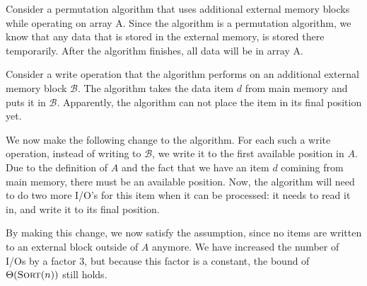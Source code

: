 Consider a permutation algorithm that uses additional external memory blocks while operating on array A.
Since the algorithm is a permutation algorithm, we know that any data that is stored in the external memory, is stored there temporarily.
After the algorithm finishes, all data will be in array A.

Consider a write operation that the algorithm performs on an additional external memory block $\mathcal{B}$.
The algorithm takes the data item $d$ from main memory and puts it in $\mathcal{B}$.
Apparently, the algorithm can not place the item in its final position yet.

We now make the following change to the algorithm.
For each such a write operation, instead of writing to $\mathcal{B}$, we write it to the first available position in $A$.
Due to the definition of $A$ and the fact that we have an item $d$ comining from main memory, there must be an available position.
Now, the algorithm will need to do two more I/O's for this item when it can be processed: it needs to read it in, and write it to its final position.

By making this change, we now satisfy the assumption, since no items are written to an external block outside of $A$ anymore.
We have increased the number of I/Os by a factor 3, but because this factor is a constant, the bound of $\Theta(\textsc{Sort}(n))$ still holds.
